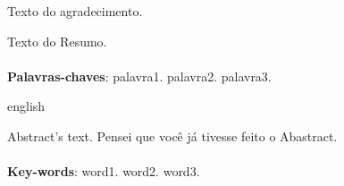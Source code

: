 \documentclass[12pt,oneside,a4paper, chapter=TITLE, section = TITLE, english, brazil]{abntex2}
\begin{document}
\begin{agradecimentos}
\begin{flushleft}
	Texto do agradecimento.
\end{flushleft}
\newpage
\end{agradecimentos}


\begin{resumo}
\setlength{\absparsep}{18pt} %

Texto do Resumo.
\\
\\
\textbf{Palavras-chaves}: palavra1. palavra2. palavra3.
\newpage
\end{resumo}


\begin{resumo}[Abstract]
\begin{otherlanguage*}{english}

Abstract's text. Pensei que você já tivesse feito o Abastract.
\\
\\ 
\textbf{Key-words}: word1. word2. word3.
\end{otherlanguage*}
\end{resumo}


\listoffigures*
\cleardoublepage


\end{document}

